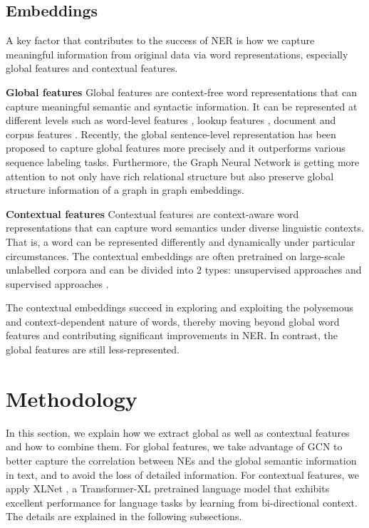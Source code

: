 \documentclass[runningheads]{llncs}
\begin{document}
\subsection{Embeddings}
A key factor that contributes to the success of NER is how we capture meaningful information from original data via word representations, especially global features and contextual features.

\noindent \textbf{Global features}
Global features are context-free word representations that can capture meaningful semantic and syntactic information. It can be represented at different levels such as word-level features \cite{liao2009simple}, lookup features \cite{hoffart2011robust}, document and corpus features \cite{ji2016joint}. 
Recently, the global sentence-level representation \cite{zhang-etal-2018-sentence} has been proposed to capture global features more precisely and it outperforms various sequence labeling tasks. Furthermore, the Graph Neural Network \cite{yao2019graph} is getting more attention to not only have rich relational structure but also preserve global structure information of a graph in graph embeddings. 

\noindent\textbf{Contextual features}
Contextual features are context-aware word representations that can capture word semantics under diverse linguistic contexts. That is, a word can be represented differently and dynamically under particular circumstances. The contextual embeddings are often pretrained on large-scale unlabelled corpora and can be divided into 2 types: unsupervised approaches \cite{lample2019cross,lan2019albert} and supervised approaches  \cite{subramanian2018learning}. 

The contextual embeddings succeed in exploring and exploiting the polysemous and context-dependent nature of words, thereby moving beyond global word features and contributing significant improvements in NER. In contrast, the global features are still less-represented. 
\vspace{-0.2cm}
\section{Methodology}
\label{sec:method}

In this section, we explain how we extract global as well as contextual features and how to combine them. For global features, we take advantage of GCN \cite{seti2020named,cetoli2017graph} to better capture the correlation between NEs and the global semantic information in text, and to avoid the loss of detailed information. For contextual features, we apply XLNet \cite{yang2019xlnet}, a Transformer-XL pretrained language model that exhibits excellent performance for language tasks by learning from bi-directional context.
The details are explained in the following subsections.
\end{document}
